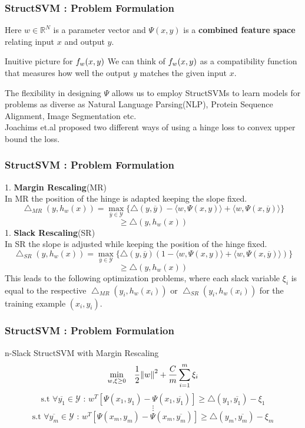 \documentclass{beamer}
\begin{document}
\begin{frame}
\frametitle{StructSVM : Problem Formulation}
Here $w \in \mathbb{R}^N$ is a parameter vector and $\Psi(x,y)$ is a \textbf{combined feature space} relating input $x$ and output $y$.
\begin{block}{Inuitive picture for $\mathnormal{f}_w(x,y)$}
We can think of $\mathnormal{f}_w(x,y)$ as a compatibility function that measures how well the output $y$ matches the given input $x$.
\end{block}
The flexibility in designing $\Psi$ allows us to employ StructSVMs to learn models for problems as diverse as Natural Language Parsing(NLP), Protein Sequence Alignment, Image Segmentation etc.\\
Joachims et.al proposed two different ways of using a hinge loss to convex upper bound the loss.\\
\end{frame}

\begin{frame}
\frametitle{StructSVM : Problem Formulation}
1. \textbf{Margin Rescaling}(MR)\\
In MR the position of the hinge is adapted keeping the slope fixed. 
\[ \bigtriangleup_{MR}(y, h_w(x)) =  \underset{\overline{y} \in \mathcal{Y}}{\max}\{ \bigtriangleup(y, \overline{y}) - \langle w , \Psi(x,y) \rangle + \langle w , \Psi(x,\overline{y}) \rangle \} \]
\[ \geq \bigtriangleup(y, h_w(x)) \]
1. \textbf{Slack Rescaling}(SR)\\
In SR the slope is adjusted while keeping the position of the hinge fixed.
\[ \bigtriangleup_{SR}(y, h_w(x)) =  \underset{\overline{y} \in \mathcal{Y}}{\max}\{ \bigtriangleup(y, \overline{y})(1 - \langle w , \Psi(x,y) \rangle + \langle w , \Psi(x,\overline{y}) \rangle) \} \]
\[ \geq \bigtriangleup(y, h_w(x)) \]
This leads to the following optimization problems, where each slack variable $\xi_i$ is equal to the respective $\bigtriangleup_{MR}(y_i, h_w(x_i))$ or $\bigtriangleup_{SR}(y_i, h_w(x_i))$ for the training example $(x_i, y_i)$.
\end{frame}


\begin{frame}
\frametitle{StructSVM : Problem Formulation}
\begin{block}{n-Slack StructSVM with Margin Rescaling}
\[\underset{w, \xi \geq 0}{\min} \quad \frac{1}{2} \norm{w}^2 + \frac{C}{m} \sum_{i=1}^m \xi_i \]
\[ \textrm{s.t } \forall \overline{y_1} \in \mathcal{Y} \textrm{  :  } w^T[\Psi(x_1, y_1) - \Psi(x_1, \overline{y_1})] \geq \bigtriangleup(y_1, \overline{y_1}) - \xi_1 \]
\[ \vdots \]
\[ \textrm{s.t } \forall \overline{y_m} \in \mathcal{Y} \textrm{  :  } w^T[\Psi(x_m, y_m) - \Psi(x_m, \overline{y_m})] \geq \bigtriangleup(y_m, \overline{y_m}) - \xi_m \]
\end{block}

\end{frame}
\end{document}
